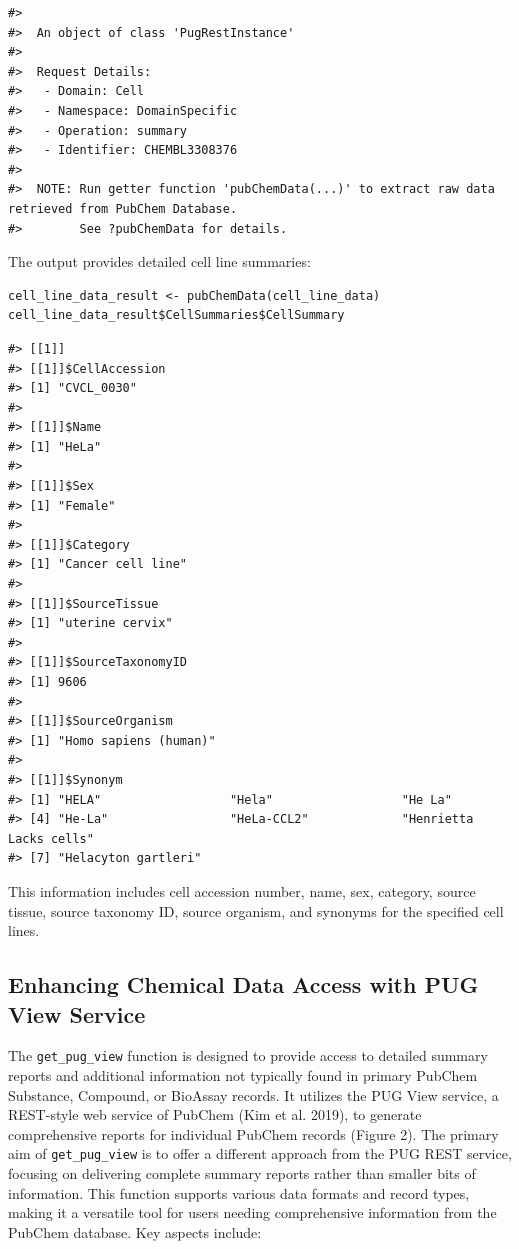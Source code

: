 \begin{verbatim}
#> 
#>  An object of class 'PugRestInstance'
#> 
#>  Request Details:  
#>   - Domain: Cell
#>   - Namespace: DomainSpecific
#>   - Operation: summary
#>   - Identifier: CHEMBL3308376
#> 
#>  NOTE: Run getter function 'pubChemData(...)' to extract raw data retrieved from PubChem Database. 
#>        See ?pubChemData for details.
\end{verbatim}

The output provides detailed cell line summaries:

\begin{verbatim}
cell_line_data_result <- pubChemData(cell_line_data)
cell_line_data_result$CellSummaries$CellSummary
\end{verbatim}

\begin{verbatim}
#> [[1]]
#> [[1]]$CellAccession
#> [1] "CVCL_0030"
#> 
#> [[1]]$Name
#> [1] "HeLa"
#> 
#> [[1]]$Sex
#> [1] "Female"
#> 
#> [[1]]$Category
#> [1] "Cancer cell line"
#> 
#> [[1]]$SourceTissue
#> [1] "uterine cervix"
#> 
#> [[1]]$SourceTaxonomyID
#> [1] 9606
#> 
#> [[1]]$SourceOrganism
#> [1] "Homo sapiens (human)"
#> 
#> [[1]]$Synonym
#> [1] "HELA"                  "Hela"                  "He La"                
#> [4] "He-La"                 "HeLa-CCL2"             "Henrietta Lacks cells"
#> [7] "Helacyton gartleri"
\end{verbatim}

This information includes cell accession number, name, sex, category, source tissue, source taxonomy ID, source organism, and synonyms for the specified cell lines.

\hypertarget{enhancing-chemical-data-access-with-pug-view-service}{%
\subsection{Enhancing Chemical Data Access with PUG View Service}\label{enhancing-chemical-data-access-with-pug-view-service}}

The \texttt{get\_pug\_view} function is designed to provide access to detailed summary reports and additional information not typically found in primary PubChem Substance, Compound, or BioAssay records. It utilizes the PUG View service, a REST-style web service of PubChem (Kim et al. 2019), to generate comprehensive reports for individual PubChem records (Figure 2). The primary aim of \texttt{get\_pug\_view} is to offer a different approach from the PUG REST service, focusing on delivering complete summary reports rather than smaller bits of information. This function supports various data formats and record types, making it a versatile tool for users needing comprehensive information from the PubChem database. Key aspects include:

